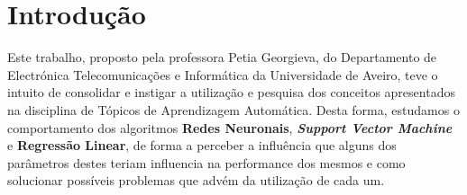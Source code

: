 \section{Introdução}
Este trabalho, proposto pela professora Petia Georgieva, do Departamento de Electrónica Telecomunicações e Informática da Universidade de Aveiro, teve o intuito de consolidar e instigar a utilização e pesquisa dos conceitos apresentados na disciplina de Tópicos de Aprendizagem Automática.
Desta forma, estudamos o comportamento dos algoritmos \textbf{Redes Neuronais}, \textbf{\textit{Support Vector Machine}} e \textbf{Regressão Linear}, de forma a perceber a influência que alguns dos parâmetros destes teriam influencia na performance dos mesmos e como solucionar possíveis problemas que advém da utilização de cada um.
